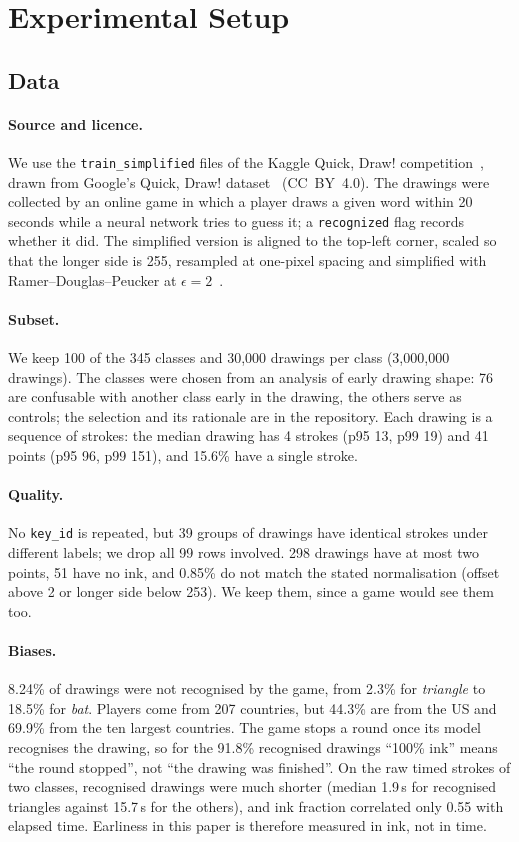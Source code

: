 \section{Experimental Setup}
\label{sec:setup}

\subsection{Data}
\label{sec:setup-data}
\paragraph{Source and licence.} We use the \texttt{train\_simplified} files of the Kaggle
Quick, Draw! competition~\cite{kaggle_quickdraw}, drawn from Google's Quick, Draw!
dataset~\cite{quickdraw_dataset} (CC~BY~4.0). The drawings were collected by an online game in
which a player draws a given word within 20 seconds while a neural network tries to guess it; a
\texttt{recognized} flag records whether it did. The simplified version is aligned to the top-left
corner, scaled so that the longer side is 255, resampled at one-pixel spacing and simplified
with Ramer--Douglas--Peucker at $\epsilon = 2$~\cite{quickdraw_dataset}.

\paragraph{Subset.} We keep 100 of the 345 classes and 30{,}000 drawings per class (3{,}000{,}000
drawings). The classes were chosen from an analysis of early drawing shape: 76 are confusable
with another class early in the drawing, the others serve as controls; the selection and its
rationale are in the repository. Each drawing is a sequence of strokes: the median drawing has 4
strokes (p95 13, p99 19) and 41 points (p95 96, p99 151), and 15.6\% have a single stroke.

\paragraph{Quality.} No \texttt{key\_id} is repeated, but 39 groups of drawings have identical
strokes under different labels; we drop all 99 rows involved. 298 drawings have at most two points,
51 have no ink, and 0.85\% do not match the stated normalisation (offset above 2 or longer side
below 253). We keep them, since a game would see them too.

\paragraph{Biases.} 8.24\% of drawings were not recognised by the game, from 2.3\% for
\emph{triangle} to 18.5\% for \emph{bat}. Players come from 207 countries, but 44.3\% are from
the US and 69.9\% from the ten largest countries. The game stops a round once its model
recognises the drawing, so for the 91.8\% recognised drawings ``100\% ink'' means ``the round
stopped'', not ``the drawing was finished''. On the raw timed strokes of two classes, recognised
drawings were much shorter (median 1.9\,s for recognised triangles against 15.7\,s for the
others), and ink fraction correlated only 0.55 with elapsed time. Earliness in this paper is
therefore measured in ink, not in time.

